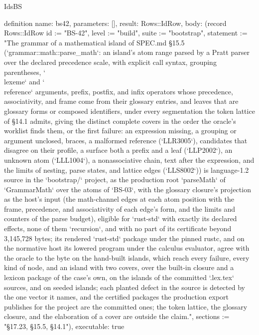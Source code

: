 \begin{lexlean}{IdsBS}
\begin{semanticmodule}
definition{
  name: bs42,
  parameters: [],
  result: Rows::IdRow,
  body: (record Rows::IdRow {id := "BS-42", level := "build", suite := "bootstrap", statement := "The grammar of a mathematical island of SPEC.md §15.5 (`grammar::math::parse_math`: an island's atom range parsed by a Pratt parser over the declared precedence scale, with explicit call syntax, grouping parentheses, `\\lexeme` and `\\reference` arguments, prefix, postfix, and infix operators whose precedence, associativity, and frame come from their glossary entries, and leaves that are glossary forms or composed identifiers, under every segmentation the token lattice of §14.1 admits, giving the distinct complete covers in the order the oracle's worklist finds them, or the first failure: an expression missing, a grouping or argument unclosed, braces, a malformed reference (`LLR3005`), candidates that disagree on their profile, a surface both a prefix and a leaf (`LLP2002`), an unknown atom (`LLL1004`), a nonassociative chain, text after the expression, and the limits of nesting, parse states, and lattice edges (`LLS8002`)) is language-1.2 source in the `bootstrap/` project, as the production root `parseMath` of `GrammarMath` over the atoms of `BS-03`, with the glossary closure's projection as the host's input (the math-channel edges at each atom position with the frame, precedence, and associativity of each edge's form, and the limits and counters of the parse budget), eligible for `rust-std` with exactly its declared effects, none of them `recursion`, and with no part of its certificate beyond 3,145,728 bytes; its rendered `rust-std` package under the pinned rustc, and on the normative host its lowered program under the calculus evaluator, agree with the oracle to the byte on the hand-built islands, which reach every failure, every kind of node, and an island with two covers, over the built-in closure and a lexicon package of the case's own, on the islands of the committed `.lex.tex` sources, and on seeded islands; each planted defect in the source is detected by the one vector it names, and the certified packages the production export publishes for the project are the committed ones; the token lattice, the glossary closure, and the elaboration of a cover are outside the claim.", sections := "§17.23, §15.5, §14.1"}),
  executable: true
}


\end{semanticmodule}
\end{lexlean}
